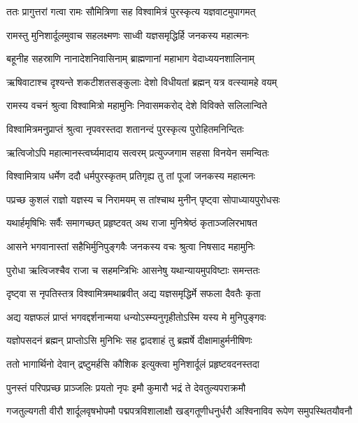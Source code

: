
\twolineshloka
{ततः प्रागुत्तरां गत्वा रामः सौमित्रिणा सह}
{विश्वामित्रं पुरस्कृत्य यज्ञवाटमुपागमत्} %

\twolineshloka
{रामस्तु मुनिशार्दूलमुवाच सहलक्ष्मणः}
{साध्वी यज्ञसमृद्धिर्हि जनकस्य महात्मनः} %

\twolineshloka
{बहूनीह सहस्राणि नानादेशनिवासिनाम्}
{ब्राह्मणानां महाभाग वेदाध्ययनशालिनाम्} %

\twolineshloka
{ऋषिवाटाश्च दृश्यन्ते शकटीशतसङ्कुलाः}
{देशो विधीयतां ब्रह्मन् यत्र वत्स्यामहे वयम्} %

\twolineshloka
{रामस्य वचनं श्रुत्वा विश्वामित्रो महामुनिः}
{निवासमकरोद् देशे विविक्ते सलिलान्विते} %

\twolineshloka
{विश्वामित्रमनुप्राप्तं श्रुत्वा नृपवरस्तदा}
{शतानन्दं पुरस्कृत्य पुरोहितमनिन्दितः} %

\twolineshloka
{ऋत्विजोऽपि महात्मानस्त्वर्घ्यमादाय सत्वरम्}
{प्रत्युज्जगाम सहसा विनयेन समन्वितः} %

\twolineshloka
{विश्वामित्राय धर्मेण ददौ धर्मपुरस्कृतम्}
{प्रतिगृह्य तु तां पूजां जनकस्य महात्मनः} %

\twolineshloka
{पप्रच्छ कुशलं राज्ञो यज्ञस्य च निरामयम्}
{स तांश्चाथ मुनीन् पृष्ट्वा सोपाध्यायपुरोधसः} %

\twolineshloka
{यथार्हमृषिभिः सर्वैः समागच्छत् प्रहृष्टवत्}
{अथ राजा मुनिश्रेष्ठं कृताञ्जलिरभाषत} %

\twolineshloka
{आसने भगवानास्तां सहैभिर्मुनिपुङ्गवैः}
{जनकस्य वचः श्रुत्वा निषसाद महामुनिः} %

\twolineshloka
{पुरोधा ऋत्विजश्चैव राजा च सहमन्त्रिभिः}
{आसनेषु यथान्यायमुपविष्टाः समन्ततः} %

\twolineshloka
{दृष्ट्वा स नृपतिस्तत्र विश्वामित्रमथाब्रवीत्}
{अद्य यज्ञसमृद्धिर्मे सफला दैवतैः कृता} %

\twolineshloka
{अद्य यज्ञफलं प्राप्तं भगवद्दर्शनान्मया}
{धन्योऽस्म्यनुगृहीतोऽस्मि यस्य मे मुनिपुङ्गवः} %

\twolineshloka
{यज्ञोपसदनं ब्रह्मन् प्राप्तोऽसि मुनिभिः सह}
{द्वादशाहं तु ब्रह्मर्षे दीक्षामाहुर्मनीषिणः} %

\twolineshloka
{ततो भागार्थिनो देवान् द्रष्टुमर्हसि कौशिक}
{इत्युक्त्वा मुनिशार्दूलं प्रहृष्टवदनस्तदा} %

\twolineshloka
{पुनस्तं परिपप्रच्छ प्राञ्जलिः प्रयतो नृपः}
{इमौ कुमारौ भद्रं ते देवतुल्यपराक्रमौ} %

\threelineshloka
{गजतुल्यगती वीरौ शार्दूलवृषभोपमौ}
{पद्मपत्रविशालाक्षौ खड्गतूणीधनुर्धरौ}
{अश्विनाविव रूपेण समुपस्थितयौवनौ} %

